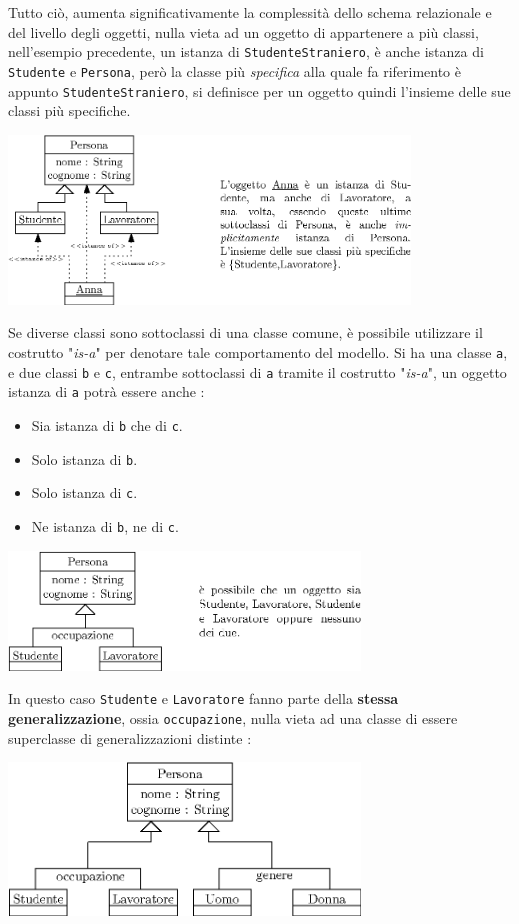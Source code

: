 \documentclass[12pt, letterpaper]{article}
\newcommand{\code}[1]{\colorbox{light-gray}{\texttt{#1}}}
\begin{document}
Tutto ciò, aumenta significativamente la complessità dello schema relazionale e del livello degli oggetti, nulla vieta 
ad un oggetto di appartenere a più classi, nell'esempio precedente, un istanza di \code{StudenteStraniero}, è anche 
istanza di \code{Studente} e \code{Persona}, però la classe più \textit{specifica} alla quale fa riferimento è appunto 
\code{StudenteStraniero}, si definisce per un oggetto quindi l'insieme delle sue classi più specifiche.
\begin{center}
    \includegraphics[width=0.8\textwidth ]{images/ClassiSpec.eps}
\end{center} 
Se diverse classi sono sottoclassi di una classe comune, è possibile utilizzare il costrutto "\textit{is-a}" per 
denotare tale comportamento del modello. Si ha una classe \code{a}, e due classi \code{b} e \code{c}, entrambe 
sottoclassi di \code{a} tramite il costrutto "\textit{is-a}", un oggetto istanza di \code{a} potrà essere anche :\begin{itemize}
    \item Sia istanza di \code{b} che di \code{c}.
    \item Solo istanza di \code{b}.
    \item Solo istanza di \code{c}.
    \item Ne istanza di \code{b}, ne di \code{c}.
\end{itemize}\begin{center}
    \includegraphics[width=0.7\textwidth ]{images/isa.eps}
\end{center} 
In questo caso \code{Studente} e \code{Lavoratore} fanno parte della \textbf{stessa generalizzazione}, ossia \code{occupazione},
nulla vieta ad una classe di essere superclasse di generalizzazioni distinte : \begin{center}
    \includegraphics[width=0.7\textwidth ]{images/isa2.eps}
\end{center} 
\end{document}
